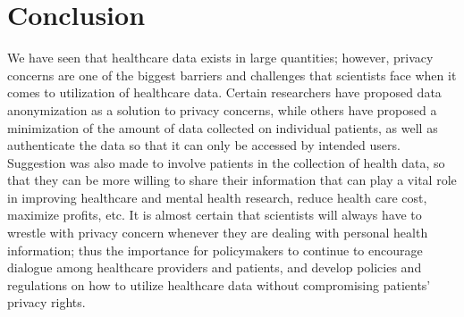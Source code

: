 \documentclass[sigconf]{acmart}
\begin{document}
 \section{Conclusion}

We have seen that healthcare data exists in large quantities; however, privacy concerns are one of the biggest barriers and challenges that  scientists face when it comes to utilization of healthcare data. Certain researchers have proposed data anonymization as a solution to privacy concerns, while others have proposed a minimization of the amount of data collected on individual patients, as well as authenticate the data so that it can only be accessed by intended users. Suggestion was also made to involve patients in the collection of health data, so that they can be more willing to share their information that can play a vital role in improving healthcare and mental health research, reduce health care cost, maximize profits, etc. It is almost certain that scientists will always have to wrestle with privacy concern whenever they are dealing with personal health information; thus the importance for policymakers to continue to encourage dialogue among healthcare providers and patients, and develop policies and regulations on how to utilize healthcare data without compromising patients' privacy rights.  

 
\end{document}

